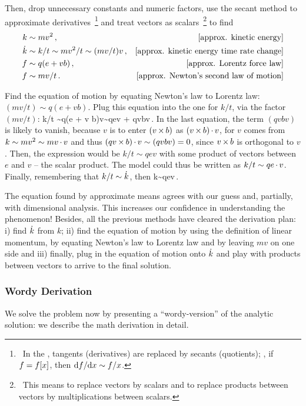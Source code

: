 Then, drop unnecessary constants and numeric factors, use the secant method to approximate derivatives~\footnote{~In the , tangents (derivatives) are replaced by secants (quotients); \ie, if $f = f\!\left[{x}\right]$, then $\text{d} f/\text{d} x\sim f/x$.} and treat vectors as scalars~\footnote{~This means to replace vectors by scalars and to replace products between vectors by multiplications between scalars.} to find
\begin{align*}
    k &\sim mv^2\,,                        &\text{[{approx. kinetic energy}]}\\
\dot{k} &\sim k/t \sim mv^2/t\sim (mv/t)v\,, &\text{[{approx. kinetic energy time rate change}]}\\
    f &\sim q(e + v b)\,,                  &\text{[{approx. Lorentz force law}]}\\
    f &\sim mv/t\,.                        &\text{[{approx. Newton's second law of motion}]}
\end{align*}

Find the equation of motion by equating Newton's law to Lorentz law: $(mv/t)\sim q(e + v b)$. Plug this equation into the one for $k/t$, via the factor $(mv/t)$:
\beq
k/t \sim q(e + v b)v\sim qev + qvbv\,.
\eeq
In the last equation, the term $(qvbv)$ is likely to vanish, because $v$ is to enter $(v\operatorname{\times} b)$ as $(v\operatorname{\times} b)\operatorname{\cdot} v$, for $v$ comes from $k\sim mv^2\sim mv\operatorname{\cdot} v$ and thus $(qv\operatorname{\times} b)\operatorname{\cdot} v \sim (qvbv) = 0$, since $v\operatorname{\times} b$ is orthogonal to $v$. Then, the expression would be $k/t\sim qev$ with some product of vectors between $e$ and $v$ -- the scalar product. The model could thus be written as $k/t\sim qe\operatorname{\cdot} v$. Finally, remembering that $k/t\sim \dot{k}$, then 
\beq
\dt k\sim qe\iprod v\,.\mqed
\eeq

The equation found by approximate means agrees with our guess and, partially, with dimensional analysis. This increases our confidence in understanding the phenomenon! Besides, all the previous methods have cleared the derivation plan: i) find $\dot{k}$ from $k$; ii) find the equation of motion by using the definition of linear momentum, by equating Newton's law to Lorentz law and by leaving $mv$ on one side and iii) finally, plug in the equation of motion onto $\dot{k}$ and play with products between vectors to arrive to the final solution.


\subsubsection{Wordy Derivation}
We solve the problem now by presenting a ``wordy-version'' of the analytic solution: we describe the math derivation in detail.

